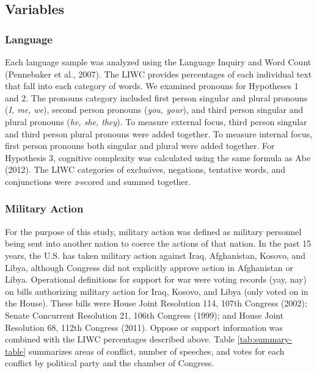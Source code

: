 \documentclass[english,,man]{apa6}
\begin{document}
\hypertarget{variables}{%
\subsection{Variables}\label{variables}}

\hypertarget{language}{%
\subsubsection{Language}\label{language}}

Each language sample was analyzed using the Language Inquiry and Word Count (Pennebaker et al., 2007). The LIWC provides percentages of each individual text that fall into each category of words. We examined pronouns for Hypotheses 1 and 2. The pronouns category included first person singular and plural pronouns (\emph{I, me, we}), second person pronouns (\emph{you, your}), and third person singular and plural pronouns (\emph{he, she, they}). To measure external focus, third person singular and third person plural pronouns were added together. To measure internal focus, first person pronouns both singular and plural were added together. For Hypothesis 3, cognitive complexity was calculated using the same formula as Abe (2012). The LIWC categories of exclusives, negations, tentative words, and conjunctions were \emph{z}-scored and summed together.

\hypertarget{military-action}{%
\subsubsection{Military Action}\label{military-action}}

For the purpose of this study, military action was defined as military personnel being sent into another nation to coerce the actions of that nation. In the past 15 years, the U.S. has taken military action against Iraq, Afghanistan, Kosovo, and Libya, although Congress did not explicitly approve action in Afghanistan or Libya. Operational definitions for support for war were voting records (yay, nay) on bills authorizing military action for Iraq, Kosovo, and Libya (only voted on in the House). These bills were House Joint Resolution 114, 107th Congress (2002); Senate Concurrent Resolution 21, 106th Congress (1999); and House Joint Resolution 68, 112th Congress (2011). Oppose or support information was combined with the LIWC percentages described above. Table \ref{tab:summary-table} summarizes areas of conflict, number of speeches, and votes for each conflict by political party and the chamber of Congress.
\end{document}
